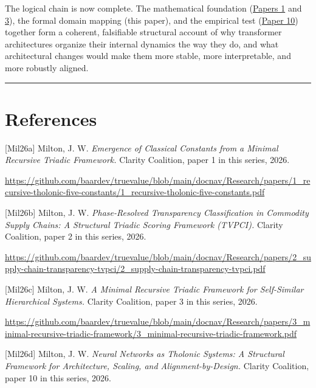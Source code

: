 \documentclass[12pt]{article}
\begin{document}
The logical chain is now complete. The mathematical foundation
(\href{https://github.com/baardev/truevalue/blob/main/docnav/Research/papers/1_recursive-tholonic-five-constants/1_recursive-tholonic-five-constants.pdf}{Papers
1} and
\href{https://github.com/baardev/truevalue/blob/main/docnav/Research/papers/3_minimal-recursive-triadic-framework/3_minimal-recursive-triadic-framework.pdf}{3}),
the formal domain mapping (this paper), and the empirical test
(\href{https://github.com/baardev/truevalue/blob/main/docnav/Research/papers/10_tholonic-neural-architecture/10_tholonic-neural-architecture.pdf}{Paper
10}) together form a coherent, falsifiable structural account of why
transformer architectures organize their internal dynamics the way they
do, and what architectural changes would make them more stable, more
interpretable, and more robustly aligned.

\begin{center}\rule{0.5\linewidth}{0.5pt}\end{center}

\section{References}\label{references}

{[}Mil26a{]} Milton, J. W. \emph{Emergence of Classical Constants from a
Minimal Recursive Triadic Framework.} Clarity Coalition, paper 1 in this
series, 2026.

\url{https://github.com/baardev/truevalue/blob/main/docnav/Research/papers/1_recursive-tholonic-five-constants/1_recursive-tholonic-five-constants.pdf}

{[}Mil26b{]} Milton, J. W. \emph{Phase-Resolved Transparency
Classification in Commodity Supply Chains: A Structural Triadic Scoring
Framework (TVPCI).} Clarity Coalition, paper 2 in this series, 2026.

\url{https://github.com/baardev/truevalue/blob/main/docnav/Research/papers/2_supply-chain-transparency-tvpci/2_supply-chain-transparency-tvpci.pdf}

{[}Mil26c{]} Milton, J. W. \emph{A Minimal Recursive Triadic Framework
for Self-Similar Hierarchical Systems.} Clarity Coalition, paper 3 in
this series, 2026.

\url{https://github.com/baardev/truevalue/blob/main/docnav/Research/papers/3_minimal-recursive-triadic-framework/3_minimal-recursive-triadic-framework.pdf}

{[}Mil26d{]} Milton, J. W. \emph{Neural Networks as Tholonic Systems: A
Structural Framework for Architecture, Scaling, and
Alignment-by-Design.} Clarity Coalition, paper 10 in this series, 2026.
\end{document}
